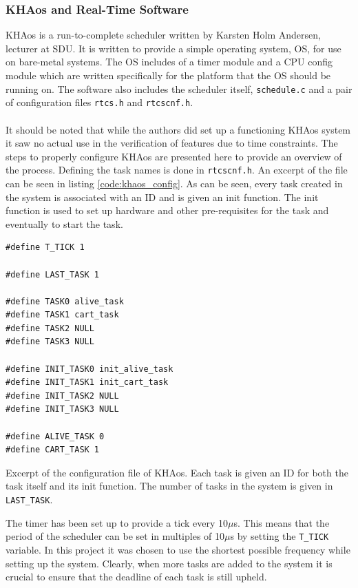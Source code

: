 \subsubsection{KHAos and Real-Time Software} %
\label{ssub:khaos}
KHAos is a run-to-complete scheduler written by Karsten Holm Andersen, lecturer at SDU.
It is written to provide a simple operating system, OS, for use on bare-metal systems.
The OS includes of a timer module and a CPU config module which are written specifically for the platform that the OS should be running on.
The software also includes the scheduler itself, \texttt{schedule.c} and a pair of configuration files \texttt{rtcs.h} and \texttt{rtcscnf.h}.
\\~\\
It should be noted that while the authors did set up a functioning KHAos system it saw no actual use in the verification of features due to time constraints.
The steps to properly configure KHAos are presented here to provide an overview of the process.
Defining the task names is done in \texttt{rtcscnf.h}.
An excerpt of the file can be seen in listing \ref{code:khaos_config}.
As can be seen, every task created in the system is associated with an ID and is given an init function.
The init function is used to set up hardware and other pre-requisites for the task and eventually to start the task. 
\begin{listing}[H]
\begin{verbatim}
#define T_TICK 1

#define LAST_TASK 1

#define TASK0 alive_task
#define TASK1 cart_task
#define TASK2 NULL
#define TASK3 NULL

#define INIT_TASK0 init_alive_task
#define INIT_TASK1 init_cart_task
#define INIT_TASK2 NULL
#define INIT_TASK3 NULL

#define ALIVE_TASK 0
#define CART_TASK 1
\end{verbatim}
\caption[Configuration file of KHAos.]{Excerpt of the configuration file of KHAos. Each task is given an ID for both the task itself and its init function. The number of tasks in the system is given in \texttt{LAST\_TASK}.}
\label{code:khaos_config}
\end{listing}
The timer has been set up to provide a tick every 10$\mu$s.
This means that the period of the scheduler can be set in multiples of 10$\mu$s by setting the \texttt{T\_TICK} variable.
In this project it was chosen to use the shortest possible frequency while setting up the system.
Clearly, when more tasks are added to the system it is crucial to ensure that the deadline of each task is still upheld.
